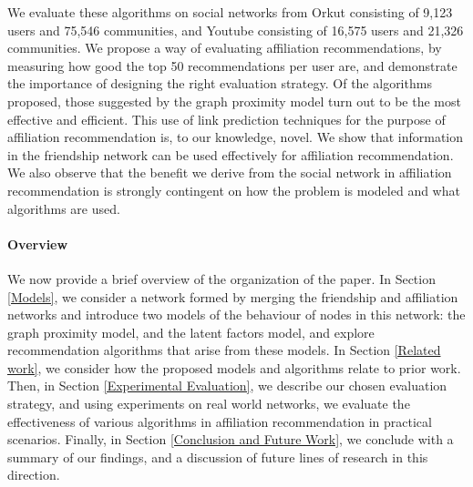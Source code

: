 We evaluate these algorithms on social networks from Orkut consisting of 9,123 users and 75,546 communities, and Youtube consisting of 16,575 users and 21,326 communities. We propose a way of evaluating affiliation recommendations, by measuring how good the top 50 recommendations per user are, and demonstrate the importance of designing the right evaluation strategy. Of the algorithms proposed, those suggested by the graph proximity model turn out to be the most effective and efficient. This use of link prediction techniques for the purpose of affiliation recommendation is, to our knowledge, novel. We show that information in the friendship network can be used effectively for affiliation recommendation. We also observe that the benefit we derive from the social network in affiliation recommendation is strongly contingent on how the problem is modeled and what algorithms are used.

\paragraph*{Overview}
We now provide a brief overview of the organization of the paper. In Section \ref{Models}, we consider a network formed by merging the friendship and affiliation networks and introduce two models of the behaviour of nodes in this network: the graph proximity model, and the latent factors model, and explore recommendation algorithms that arise from these models. In Section \ref{Related work}, we consider how the proposed models and algorithms relate to prior work. Then, in Section \ref{Experimental Evaluation}, we describe our chosen evaluation strategy, and using experiments on real world networks, we evaluate the effectiveness of various algorithms in affiliation recommendation in practical scenarios. Finally, in Section \ref{Conclusion and Future Work}, we conclude with a summary of our findings, and a discussion of future lines of research in this direction.

